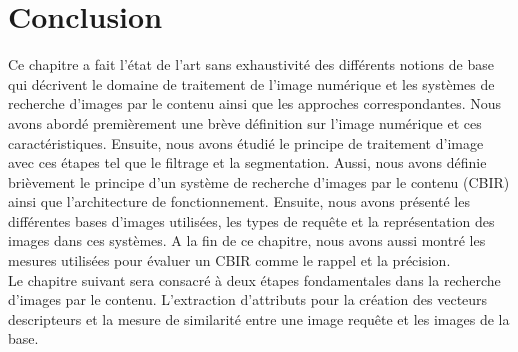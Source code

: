

\section{Conclusion}
Ce chapitre a fait l’état de l’art sans exhaustivité des différents notions de base qui décrivent le domaine de traitement de l'image numérique et les systèmes de  recherche d'images par le contenu ainsi que les approches correspondantes. Nous avons abordé premièrement une brève définition sur l’image numérique et ces caractéristiques. Ensuite, nous avons étudié le principe de traitement d’image avec ces étapes tel que le filtrage et la segmentation. Aussi, nous avons définie brièvement le principe d’un système
de recherche d’images par le contenu (CBIR) ainsi que l’architecture de
fonctionnement. Ensuite, nous avons présenté les différentes bases d’images
utilisées, les types de requête et la représentation des images dans ces
systèmes. A la fin de ce chapitre, nous avons aussi montré les mesures
utilisées pour évaluer un CBIR comme le rappel et la précision.\\

Le chapitre suivant sera consacré à deux étapes fondamentales dans la
recherche d’images par le contenu. L’extraction d’attributs pour la création
des vecteurs descripteurs et la mesure de similarité entre une image requête et les images de la base.

